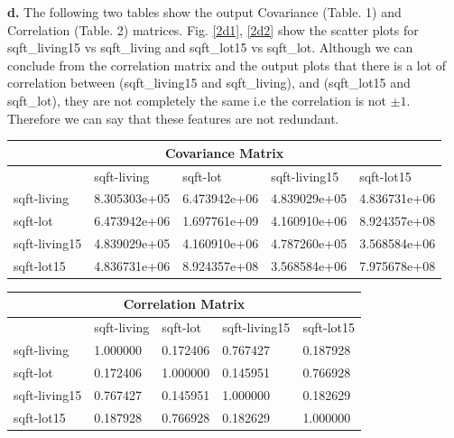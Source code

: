 \documentclass{article}
\begin{document}
\pagebreak
\textbf{d.} The following two tables show the output Covariance (Table. 1) and Correlation (Table. 2) matrices. Fig. \ref{2d1}, \ref{2d2} show the scatter plots for sqft\_living15 vs sqft\_living and sqft\_lot15 vs sqft\_lot. Although we can conclude from the correlation matrix and the output plots that there is a lot of correlation between (sqft\_living15 and sqft\_living), and (sqft\_lot15 and sqft\_lot), they are not completely the same i.e the correlation is not $\pm1$. Therefore we can say that these features are not redundant.

\begin{table}[ht]
\centering
\begin{tabular}{ |p{2cm}||p{2cm}||p{2cm}|p{2cm}|p{2cm}|  }
 \hline
 \multicolumn{5}{|c|}{Covariance Matrix} \\
 \hline
  &	sqft-living&  sqft-lot&  sqft-living15&  sqft-lot15\\
 \hline
 sqft-living&	8.305303e+05&	6.473942e+06&	4.839029e+05&	4.836731e+06\\
 sqft-lot&	6.473942e+06&	1.697761e+09&	4.160910e+06&	8.924357e+08\\
 sqft-living15&	4.839029e+05&	4.160910e+06&	4.787260e+05&	3.568584e+06\\
 sqft-lot15&	4.836731e+06&	8.924357e+08&	3.568584e+06&	7.975678e+08\\
 \hline
\end{tabular}
\label{Tab:covar}
\end{table}


\begin{center}
\begin{table}[ht]
\begin{tabular}{ |p{2cm}||p{2cm}||p{2cm}|p{2cm}|p{2cm}|  }
 \hline
 \multicolumn{5}{|c|}{Correlation Matrix} \\
 \hline
  &	sqft-living&  sqft-lot&  sqft-living15&  sqft-lot15\\
 \hline
 sqft-living&	1.000000&	0.172406&	0.767427&	0.187928\\
 sqft-lot&	0.172406&	1.000000&	0.145951&	0.766928\\
 sqft-living15&	0.767427&	0.145951&	1.000000&	0.182629\\
 sqft-lot15&	0.187928&	0.766928&	0.182629&	1.000000\\
 \hline
\end{tabular}
\label{Tab:correl}
\end{table}
\end{center}
\end{document}
